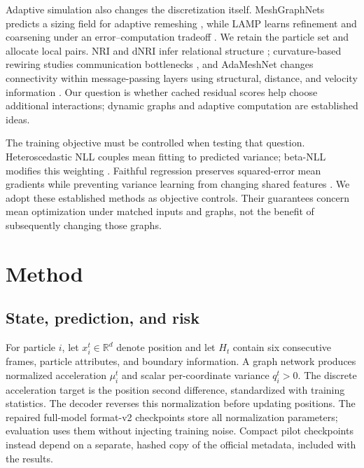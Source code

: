 Adaptive simulation also changes the discretization itself. MeshGraphNets predicts a sizing field for adaptive remeshing \citep{pfaff2021}, while LAMP learns refinement and coarsening under an error--computation tradeoff \citep{wu2023}. We retain the particle set and allocate local pairs. NRI and dNRI infer relational structure \citep{kipf2018,graber2020}; curvature-based rewiring studies communication bottlenecks \citep{topping2022}, and AdaMeshNet changes connectivity within message-passing layers using structural, distance, and velocity information \citep{seo2025}. Our question is whether cached residual scores help choose additional interactions; dynamic graphs and adaptive computation are established ideas.

The training objective must be controlled when testing that question. Heteroscedastic NLL couples mean fitting to predicted variance; beta-NLL modifies this weighting \citep{seitzer2022}. Faithful regression preserves squared-error mean gradients while preventing variance learning from changing shared features \citep{stirn2023}. We adopt these established methods as objective controls. Their guarantees concern mean optimization under matched inputs and graphs, not the benefit of subsequently changing those graphs.

\section{Method}
\subsection{State, prediction, and risk}
For particle $i$, let $x_i^t\in\mathbb R^d$ denote position and let $H_t$ contain six consecutive frames, particle attributes, and boundary information. A graph network produces normalized acceleration $\mu_i^t$ and scalar per-coordinate variance $q_i^t>0$. The discrete acceleration target is the position second difference, standardized with training statistics. The decoder reverses this normalization before updating positions. The repaired full-model format-v2 checkpoints store all normalization parameters; evaluation uses them without injecting training noise. Compact pilot checkpoints instead depend on a separate, hashed copy of the official metadata, included with the results.

